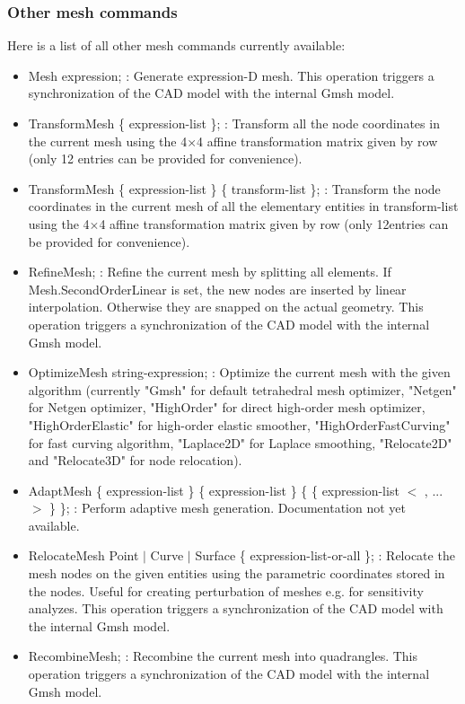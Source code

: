 \documentclass[dvipdfmx, 9pt, a4paper]{article}
\numberwithin{equation}{section}
\begin{document}
\subsubsection{Other mesh commands}
Here is a list of all other mesh commands currently available:
\begin{itemize}
\item Mesh expression; : Generate expression-D mesh. This operation triggers a synchronization of the CAD model with the internal Gmsh model.
\item TransformMesh \{ expression-list \}; : Transform all the node coordinates in the current mesh using the 4$\times$4 affine transformation matrix given by row (only 12 entries can be provided for convenience).
\item TransformMesh \{ expression-list \} \{ transform-list \}; : Transform the node coordinates in the current mesh of all the elementary entities in transform-list using the 4$\times$4 affine transformation matrix given by row (only 12entries can be provided for convenience).
\item RefineMesh; : Refine the current mesh by splitting all elements. If Mesh.SecondOrderLinear is set, the new nodes are inserted by linear interpolation. Otherwise they are snapped on the actual geometry. This operation triggers a synchronization of the CAD model with the internal Gmsh model.
\item OptimizeMesh string-expression; : Optimize the current mesh with the given algorithm (currently "Gmsh" for default tetrahedral mesh optimizer, "Netgen" for Netgen optimizer, "HighOrder" for direct high-order mesh optimizer, "HighOrderElastic" for high-order elastic smoother, "HighOrderFastCurving" for fast curving algorithm, "Laplace2D" for Laplace smoothing, "Relocate2D" and "Relocate3D" for node relocation).
\item AdaptMesh \{ expression-list \} \{ expression-list \} \{ \{ expression-list $<$ , ... $>$ \} \}; : Perform adaptive mesh generation. Documentation not yet available.
\item RelocateMesh Point $|$ Curve $|$ Surface \{ expression-list-or-all \}; : Relocate the mesh nodes on the given entities using the parametric coordinates stored in the nodes. Useful for creating perturbation of meshes e.g. for sensitivity analyzes. This operation triggers a synchronization of the CAD model with the internal Gmsh model.
\item RecombineMesh; : Recombine the current mesh into quadrangles. This operation triggers a synchronization of the CAD model with the internal Gmsh model.

\end{itemize}
\end{document}
